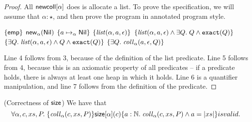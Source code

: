\begin{proof}
All $\mathsf{newcoll}[\alpha]$ does is allocate a list. To prove the
specification, we will assume that $\alpha:\star$, and then prove the
program in annotated program style.

\begin{specification}
\nextline $\{{\mathsf{emp}}\}$ 
\nextline $\mathsf{new}_{\alpha}(\mathsf{Nil})$ 
\nextline $\{{a \mapsto_\alpha \mathsf{Nil}}\}$ 
\nextline $\{{\mathit{list}(\alpha, a, \epsilon)}\}$ 
\nextline $\{{\mathit{list}(\alpha, a, \epsilon) \land \exists Q.\; Q \land \mathtt{exact}({Q})}\}$ 
\nextline $\{{\exists Q.\;\mathit{list}(\alpha, a, \epsilon) \land Q \land \mathtt{exact}({Q})}\}$ 
\nextline $\{{\exists Q.\; \mathit{coll}_\alpha(a, \epsilon, Q)}\}$ 
\end{specification}

Line 4 follows from 3, because of the definition of the list predicate. Line 5 
follows from 4, because this is an axiomatic property of all predicates -- if
a predicate holds, there is always at least one heap in which it holds. Line 6 
is a quantifier manipulation, and line 7 follows from the definition of the predicate.
\end{proof}

\begin{lemma}{(Correctness of $\mathsf{size}$)}
We have that 
\begin{displaymath}
\forall \alpha, c, xs, P.\; \{{\mathit{coll}_\alpha(c, xs, P)}\}{\mathsf{size}[\alpha](c)}\{{a:\mathbb{N}}.\;{\mathit{coll}_\alpha(c, xs, P) \land a = |xs|}\}
is valid.   
\end{displaymath}
\end{lemma}

